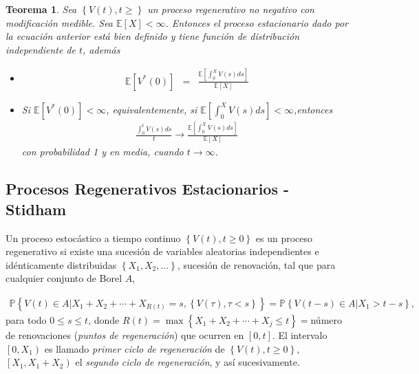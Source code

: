 \documentclass{article}
\newtheorem{Teo}{Teorema}
\newcommand{\esp}{\mathbb{E}}
\newcommand{\prob}{\mathbb{P}}
\begin{document}
\begin{Teo}
Sea $\left\{V\left(t\right),t\geq\right\}$ un proceso regenerativo no negativo con modificaci\'on medible. Sea $\esp\left[X\right]<\infty$. Entonces el proceso estacionario dado por la ecuaci\'on anterior est\'a bien definido y tiene funci\'on de distribuci\'on independiente de $t$, adem\'as
\begin{itemize}
\item[i)] \begin{eqnarray*}
\esp\left[V^{*}\left(0\right)\right]&=&\frac{\esp\left[\int_{0}^{X}V\left(s\right)ds\right]}{\esp\left[X\right]}\end{eqnarray*}
\item[ii)] Si $\esp\left[V^{*}\left(0\right)\right]<\infty$, equivalentemente, si $\esp\left[\int_{0}^{X}V\left(s\right)ds\right]<\infty$,entonces
\begin{eqnarray*}
\frac{\int_{0}^{t}V\left(s\right)ds}{t}\rightarrow\frac{\esp\left[\int_{0}^{X}V\left(s\right)ds\right]}{\esp\left[X\right]}
\end{eqnarray*}
con probabilidad 1 y en media, cuando $t\rightarrow\infty$.
\end{itemize}
\end{Teo}


\subsection{Procesos Regenerativos Estacionarios - Stidham \cite{Stidham}}


Un proceso estoc\'astico a tiempo continuo $\left\{V\left(t\right),t\geq0\right\}$ es un proceso regenerativo si existe una sucesi\'on de variables aleatorias independientes e id\'enticamente distribuidas $\left\{X_{1},X_{2},\ldots\right\}$, sucesi\'on de renovaci\'on, tal que para cualquier conjunto de Borel $A$, 

\begin{eqnarray*}
\prob\left\{V\left(t\right)\in A|X_{1}+X_{2}+\cdots+X_{R\left(t\right)}=s,\left\{V\left(\tau\right),\tau<s\right\}\right\}=\prob\left\{V\left(t-s\right)\in A|X_{1}>t-s\right\},
\end{eqnarray*}
para todo $0\leq s\leq t$, donde $R\left(t\right)=\max\left\{X_{1}+X_{2}+\cdots+X_{j}\leq t\right\}=$n\'umero de renovaciones ({\emph{puntos de regeneraci\'on}}) que ocurren en $\left[0,t\right]$. El intervalo $\left[0,X_{1}\right)$ es llamado {\emph{primer ciclo de regeneraci\'on}} de $\left\{V\left(t \right),t\geq0\right\}$, $\left[X_{1},X_{1}+X_{2}\right)$ el {\emph{segundo ciclo de regeneraci\'on}}, y as\'i sucesivamente.
\end{document}

